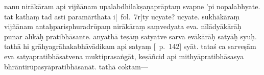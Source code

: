 \documentclass[12pt]{article}
\begin{document}
% 
 
nanu nirākāram api vijñānam upalabdhilakṣaṇaprāptaṃ svapne 'pi nopalabhyate. tat kathaṃ tad asti paramārthata\footnoteB{
	paramārthata] \emd ; paramārtham \MS\ \EDD
} i[\MS\ fol.\ 7r]ty ucyate? ucyate. sukhākāraṃ vijñānam antaḥparisphuradrūpaṃ nirākāraṃ saṃvedyata eva. nīlādyākārāḥ punar alīkāḥ pratibhāsante. %
anyathā teṣāṃ satyatve sarva evākārāḥ satyāḥ syuḥ. tathā hi grāhyagrāhakabhāvādikam api satyaṃ [\EDD\ p.\ 142] syāt. tataś ca sarveṣām eva satyapratibhāsatvena muktiprasaṅgāt,\footnoteB{
	muktiprasaṅgāt] \EDD\ (\emd); yuktiprasaṅgāt \MS
} keṣāñcid api mithyāpratibhāsasya bhrāntirūpasyāpratibhāsanāt. tathā coktam—
\end{document}
